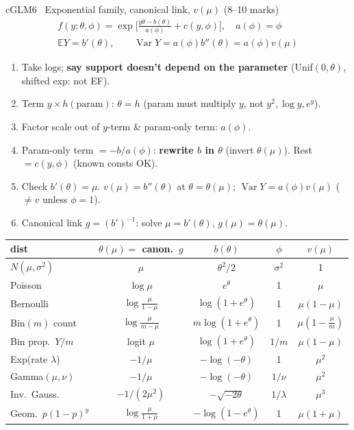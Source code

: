 \documentclass{article}
\newenvironment{steps}{\begin{enumerate}[label=\arabic*.,leftmargin=7pt,labelsep=1.2pt]}{\end{enumerate}}
\newcommand{\E}{\mathbb E}
\newcommand{\V}{\operatorname{Var}}
\begin{document}
\begin{multicols*}{3}
\begin{tb}{cGLM}{6 \textbullet\ Exponential family, canonical link, $v(\mu)$ (8--10 marks)}
\[\begin{gathered}f(y;\theta,\phi)=\exp\Big[\frac{y\theta-b(\theta)}{a(\phi)}+c(y,\phi)\Big],\quad a(\phi)=\phi\\ \E Y=b'(\theta),\qquad \V Y=a(\phi)b''(\theta)=a(\phi)v(\mu)\end{gathered}\]
\begin{steps}
\item Take logs; \textbf{say support doesn't depend on the parameter} (Unif$(0,\theta)$, shifted exp: not EF).
\item Term $y\times h(\text{param})$: $\theta=h$ (param must multiply $y$, not $y^2,\log y,e^y$).
\item Factor scale out of $y$-term \& param-only term: $a(\phi)$.
\item Param-only term $=-b/a(\phi)$: \textbf{rewrite $b$ in $\theta$} (invert $\theta(\mu)$). Rest $=c(y,\phi)$ (known consts OK).
\item Check $b'(\theta)=\mu$. $v(\mu)=b''(\theta)$ at $\theta=\theta(\mu)$; $\V Y=a(\phi)v(\mu)$ ($\ne v$ unless $\phi=1$).
\item Canonical link $g=(b')^{-1}$: solve $\mu=b'(\theta)$, $g(\mu)=\theta(\mu)$.
\end{steps}
\begin{tabularx}{\linewidth}{@{}L|c|c|c|c@{}}
dist & $\theta(\mu)=$ canon.\ $g$ & $b(\theta)$ & $\phi$ & $v(\mu)$\\\hline
$N(\mu,\sigma^2)$ & $\mu$ & $\theta^2/2$ & $\sigma^2$ & 1\\
Poisson & $\log\mu$ & $e^\theta$ & 1 & $\mu$\\
Bernoulli & $\log\frac{\mu}{1-\mu}$ & $\log(1+e^\theta)$ & 1 & $\mu(1-\mu)$\\
Bin$(m)$ count & $\log\frac{\mu}{m-\mu}$ & $m\log(1+e^\theta)$ & 1 & $\mu(1-\frac\mu m)$\\
Bin prop.\ $Y/m$ & logit $\mu$ & $\log(1+e^\theta)$ & $1/m$ & $\mu(1-\mu)$\\
Exp(rate $\lambda$) & $-1/\mu$ & $-\log(-\theta)$ & 1 & $\mu^2$\\
Gamma$(\mu,\nu)$ & $-1/\mu$ & $-\log(-\theta)$ & $1/\nu$ & $\mu^2$\\
Inv.\ Gauss. & $-1/(2\mu^2)$ & $-\sqrt{-2\theta}$ & $1/\lambda$ & $\mu^3$\\
Geom.\ $p(1{-}p)^y$ & $\log\frac{\mu}{1+\mu}$ & $-\log(1-e^\theta)$ & 1 & $\mu(1+\mu)$\\

\end{tabularx}
\end{tb}
\end{multicols*}
\end{document}
